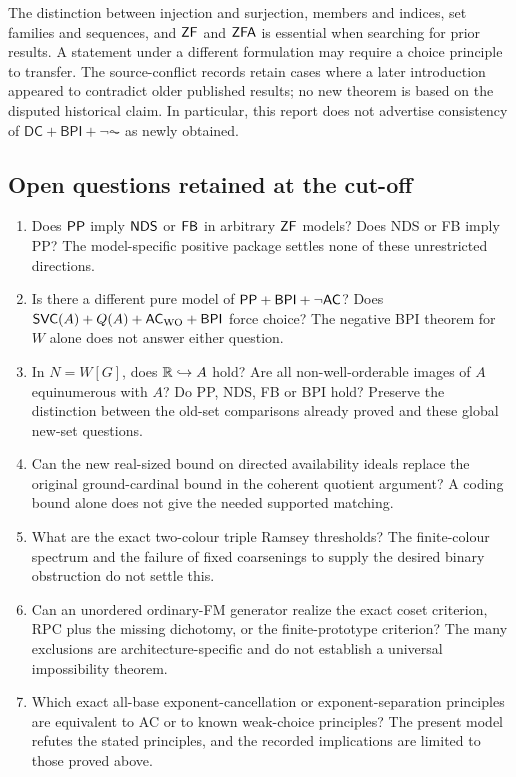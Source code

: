 The distinction between injection and surjection, members and indices, set families and sequences, and $\mathsf{ZF}$ and $\mathsf{ZFA}$ is essential when searching for prior results. A statement under a different formulation may require a choice principle to transfer. The source-conflict records retain cases where a later introduction appeared to contradict older published results; no new theorem is based on the disputed historical claim. In particular, this report does not advertise consistency of $\mathsf{DC}+\mathsf{BPI}+\neg\AC$ as newly obtained.

\subsection{Open questions retained at the cut-off}
\begin{enumerate}
\item Does $\mathsf{PP}$ imply $\mathsf{NDS}$ or $\mathsf{FB}$ in arbitrary $\mathsf{ZF}$ models? Does NDS or FB imply PP? The model-specific positive package settles none of these unrestricted directions.
\item Is there a different pure model of $\mathsf{PP}+\mathsf{BPI}+\neg\mathsf{AC}$? Does $\mathsf{SVC}(A)+Q(A)+\mathsf{AC}_{\mathrm{WO}}+\mathsf{BPI}$ force choice? The negative BPI theorem for $W$ alone does not answer either question.
\item In $N=W[G]$, does $\mathbb R\hookrightarrow A$ hold? Are all non-well-orderable images of $A$ equinumerous with $A$? Do PP, NDS, FB or BPI hold? Preserve the distinction between the old-set comparisons already proved and these global new-set questions.
\item Can the new real-sized bound on directed availability ideals replace the original ground-cardinal bound in the coherent quotient argument? A coding bound alone does not give the needed supported matching.
\item What are the exact two-colour triple Ramsey thresholds? The finite-colour spectrum and the failure of fixed coarsenings to supply the desired binary obstruction do not settle this.
\item Can an unordered ordinary-FM generator realize the exact coset criterion, RPC plus the missing dichotomy, or the finite-prototype criterion? The many exclusions are architecture-specific and do not establish a universal impossibility theorem.
\item Which exact all-base exponent-cancellation or exponent-separation principles are equivalent to AC or to known weak-choice principles? The present model refutes the stated principles, and the recorded implications are limited to those proved above.
\end{enumerate}

